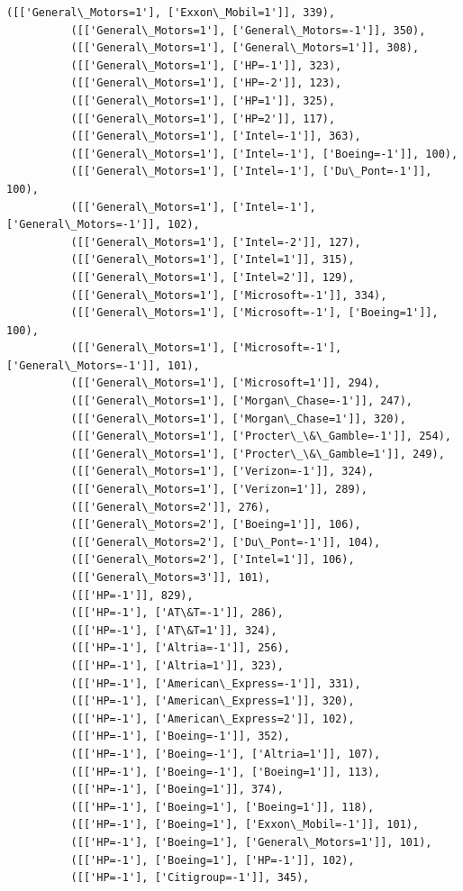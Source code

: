 \documentclass[11pt]{article}
\begin{document}
\begin{Verbatim}[commandchars=\\\{\}]
          ([['General\_Motors=1'], ['Exxon\_Mobil=1']], 339),
          ([['General\_Motors=1'], ['General\_Motors=-1']], 350),
          ([['General\_Motors=1'], ['General\_Motors=1']], 308),
          ([['General\_Motors=1'], ['HP=-1']], 323),
          ([['General\_Motors=1'], ['HP=-2']], 123),
          ([['General\_Motors=1'], ['HP=1']], 325),
          ([['General\_Motors=1'], ['HP=2']], 117),
          ([['General\_Motors=1'], ['Intel=-1']], 363),
          ([['General\_Motors=1'], ['Intel=-1'], ['Boeing=-1']], 100),
          ([['General\_Motors=1'], ['Intel=-1'], ['Du\_Pont=-1']], 100),
          ([['General\_Motors=1'], ['Intel=-1'], ['General\_Motors=-1']], 102),
          ([['General\_Motors=1'], ['Intel=-2']], 127),
          ([['General\_Motors=1'], ['Intel=1']], 315),
          ([['General\_Motors=1'], ['Intel=2']], 129),
          ([['General\_Motors=1'], ['Microsoft=-1']], 334),
          ([['General\_Motors=1'], ['Microsoft=-1'], ['Boeing=1']], 100),
          ([['General\_Motors=1'], ['Microsoft=-1'], ['General\_Motors=-1']], 101),
          ([['General\_Motors=1'], ['Microsoft=1']], 294),
          ([['General\_Motors=1'], ['Morgan\_Chase=-1']], 247),
          ([['General\_Motors=1'], ['Morgan\_Chase=1']], 320),
          ([['General\_Motors=1'], ['Procter\_\&\_Gamble=-1']], 254),
          ([['General\_Motors=1'], ['Procter\_\&\_Gamble=1']], 249),
          ([['General\_Motors=1'], ['Verizon=-1']], 324),
          ([['General\_Motors=1'], ['Verizon=1']], 289),
          ([['General\_Motors=2']], 276),
          ([['General\_Motors=2'], ['Boeing=1']], 106),
          ([['General\_Motors=2'], ['Du\_Pont=-1']], 104),
          ([['General\_Motors=2'], ['Intel=1']], 106),
          ([['General\_Motors=3']], 101),
          ([['HP=-1']], 829),
          ([['HP=-1'], ['AT\&T=-1']], 286),
          ([['HP=-1'], ['AT\&T=1']], 324),
          ([['HP=-1'], ['Altria=-1']], 256),
          ([['HP=-1'], ['Altria=1']], 323),
          ([['HP=-1'], ['American\_Express=-1']], 331),
          ([['HP=-1'], ['American\_Express=1']], 320),
          ([['HP=-1'], ['American\_Express=2']], 102),
          ([['HP=-1'], ['Boeing=-1']], 352),
          ([['HP=-1'], ['Boeing=-1'], ['Altria=1']], 107),
          ([['HP=-1'], ['Boeing=-1'], ['Boeing=1']], 113),
          ([['HP=-1'], ['Boeing=1']], 374),
          ([['HP=-1'], ['Boeing=1'], ['Boeing=1']], 118),
          ([['HP=-1'], ['Boeing=1'], ['Exxon\_Mobil=-1']], 101),
          ([['HP=-1'], ['Boeing=1'], ['General\_Motors=1']], 101),
          ([['HP=-1'], ['Boeing=1'], ['HP=-1']], 102),
          ([['HP=-1'], ['Citigroup=-1']], 345),

\end{Verbatim}
\end{document}
